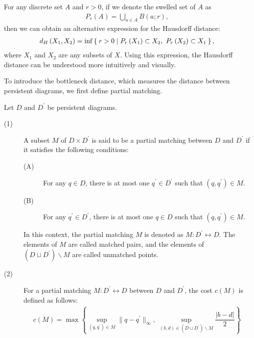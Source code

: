 \documentclass[dvipdfmx,11pt,notheorems]{article}
\begin{document}
For any discrete set $A$ and $r > 0$, if we denote the swelled set of $A$ as
\begin{align*}
  P_r \left( A \right) = \bigcup_{a \in A} B\left( a; r \right),
\end{align*}
then we can obtain an alternative expression for the Hausdorff distance:
\begin{align*}
  d_H\left( X_1, X_2 \right) = \inf \Set{ r > 0 | P_r\left( X_1 \right) \subset X_2,\ P_r\left( X_2 \right) \subset X_1 },
\end{align*}
where $X_1$ and $X_2$ are any subsets of $X$. Using this expression, the Hausdorff distance can be understood more intuitively and visually.

To introduce the bottleneck distance, which measures the distance between persistent diagrams, we first define partial matching.

\begin{dfn}
  Let $D$ and $D^\prime$ be persistent diagrams.
  \begin{description}
    \item[(1)] A subset $M$ of $D \times D^\prime$ is said to be a partial matching between $D$ and $D^\prime$ if it satisfies the following conditions:
          \begin{description}
            \item[(A)] For any $q \in D$, there is at most one $q^\prime \in D^\prime$ such that $\left( q, q^\prime \right) \in M$.
            \item[(B)] For any $q^\prime \in D^\prime$, there is at most one $q \in D$ such that $\left( q, q^\prime \right) \in M$.
          \end{description}
          In this context, the partial matching $M$ is denoted as $M : D^\prime \leftrightarrow D$. The elements of $M$ are called matched pairs, and the elements of $\left( D \sqcup D^\prime \right) \backslash M$ are called unmatched points.
    \item[(2)] For a partial matching $M : D^\prime \leftrightarrow D$ between $D$ and $D^\prime$, the cost $c\left( M \right)$ is defined as follows:
          \begin{align*}
            c\left( M \right) = \max\left\{\sup_{\left( q, q^\prime \right) \in M} \|q - q^\prime\|_\infty, \ \sup_{\left( b, d \right)\in \left( D\sqcup D^\prime \right)\backslash M} \dfrac{\left| b - d \right|}{2}\right\}
          \end{align*}
  \end{description}
\end{dfn}
\end{document}
